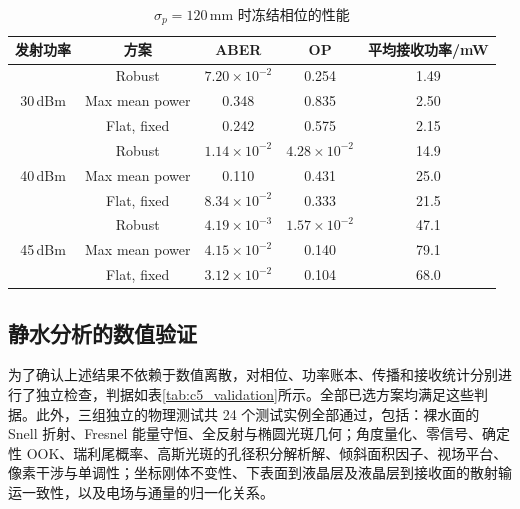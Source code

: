 \begin{table}[htbp]
\caption{$\sigma_p=120\,\mathrm{mm}$ 时冻结相位的性能}
\label{tab:c5_frozen}
\centering
\begin{tabular}{ccccc}
\toprule
发射功率 & 方案 & ABER & OP & 平均接收功率/mW \\
\midrule
\multirow{3}{*}{30\,dBm} & Robust & $7.20\times10^{-2}$ & 0.254 & 1.49 \\
 & Max mean power & 0.348 & 0.835 & 2.50 \\
 & Flat, fixed & 0.242 & 0.575 & 2.15 \\
\midrule
\multirow{3}{*}{40\,dBm} & Robust & $1.14\times10^{-2}$ & $4.28\times10^{-2}$ & 14.9 \\
 & Max mean power & 0.110 & 0.431 & 25.0 \\
 & Flat, fixed & $8.34\times10^{-2}$ & 0.333 & 21.5 \\
\midrule
\multirow{3}{*}{45\,dBm} & Robust & $4.19\times10^{-3}$ & $1.57\times10^{-2}$ & 47.1 \\
 & Max mean power & $4.15\times10^{-2}$ & 0.140 & 79.1 \\
 & Flat, fixed & $3.12\times10^{-2}$ & 0.104 & 68.0 \\
\bottomrule
\end{tabular}
\end{table}

\subsection{静水分析的数值验证}

为了确认上述结果不依赖于数值离散，对相位、功率账本、传播和接收统计分别进行了独立检查，判据如表\ref{tab:c5_validation}所示。全部已选方案均满足这些判据。此外，三组独立的物理测试共 24 个测试实例全部通过，包括：裸水面的 Snell 折射、Fresnel 能量守恒、全反射与椭圆光斑几何；角度量化、零信号、确定性 OOK、瑞利尾概率、高斯光斑的孔径积分解析解、倾斜面积因子、视场平台、像素干涉与单调性；坐标刚体不变性、下表面到液晶层及液晶层到接收面的散射输运一致性，以及电场与通量的归一化关系。

